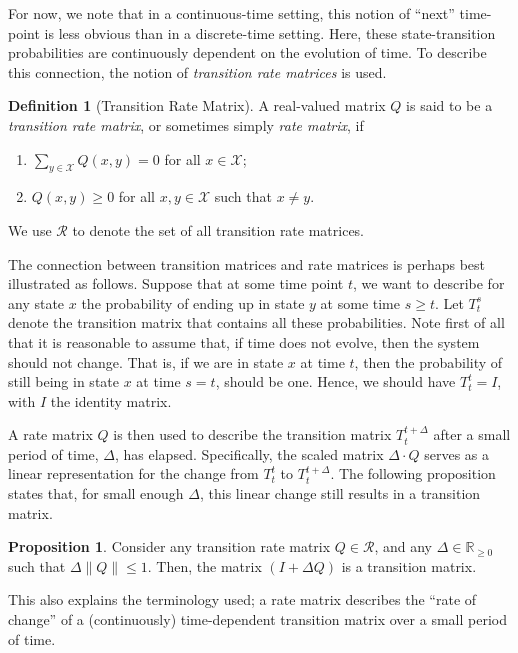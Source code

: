 \documentclass[10pt,a4paper]{paper}
\theoremstyle{definition}
\newtheorem{proposition}[theorem]{Proposition}
\newtheorem{definition}{Definition}
\newcommand{\reals}{\mathbb{R}}
\newcommand{\realsnonneg}{\reals_{\geq 0}}
\newcommand{\states}{\mathcal{X}}
\newcommand{\norm}[1]{\left\lVert #1 \right\rVert}
\begin{document}
For now, we note that in a continuous-time setting, this notion of ``next'' time-point is less obvious than in a discrete-time setting. Here, these state-transition probabilities are continuously dependent on the evolution of time. To describe this connection, the notion of \emph{transition rate matrices} is used.
\begin{definition}[Transition Rate Matrix]\label{def:rate_matrix}
A real-valued matrix $Q$ is said to be a \emph{transition rate matrix}, or sometimes simply \emph{rate matrix}, if

\vspace{5pt}
\begin{enumerate}[label=R\arabic*:,ref=R\arabic*]
\item\label{def:Q:sumzero}
$\sum_{y\in\states}Q(x,y)=0$ for all $x\in\states$;
\item\label{def:Q:nonnegoffdiagonal}
$Q(x,y)\geq0$ for all $x,y\in\states$ such that $x\neq y$.
\end{enumerate}
\noindent
We use $\mathcal{R}$ to denote the set of all transition rate matrices. 
\vspace{5pt}
\end{definition}

The connection between transition matrices and rate matrices is perhaps best illustrated as follows. Suppose that at some time point $t$, we want to describe for any state $x$ the probability of ending up in state $y$ at some time $s\geq t$. Let $T_t^s$ denote the transition matrix that contains all these probabilities. Note first of all that it is reasonable to assume that, if time does not evolve, then the system should not change. That is, if we are in state $x$ at time $t$, then the probability of still being in state $x$ at time $s=t$, should be one. Hence, we should have $T_t^t=I$, with $I$ the identity matrix. 

A rate matrix $Q$ is then used to describe the transition matrix $T_t^{t+\Delta}$ after a small period of time, $\Delta$, has elapsed. Specifically, the scaled matrix $\Delta\cdot Q$ serves as a linear representation for the change from $T_t^t$ to $T_t^{t+\Delta}$. The following proposition states that, for small enough $\Delta$, this linear change still results in a transition matrix.

\begin{proposition}\label{prop:stochastic_from_rate_matrix}
Consider any transition rate matrix $Q\in\mathcal{R}$, and any $\Delta\in\realsnonneg$ such that $\Delta \norm{Q}\leq 1$. Then, the matrix $(I+\Delta Q)$ is a transition matrix.
\end{proposition}
This also explains the terminology used; a rate matrix describes the ``rate of change'' of a (continuously) time-dependent transition matrix over a small period of time.
\end{document}
